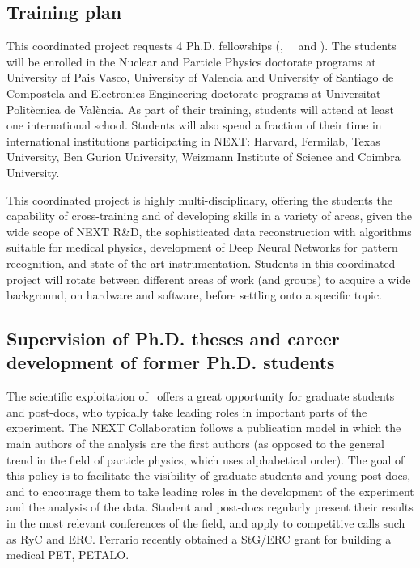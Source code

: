 \subsection{\label{subsubsec:training}Training plan}

\indent 

This coordinated project requests 4 Ph.D. fellowships (\sDIPC, \sIFIC\ \sUSC\ and \sUPV). The students will be enrolled in the Nuclear and Particle Physics doctorate programs at University of Pais Vasco, University of Valencia and University of Santiago de Compostela and Electronics Engineering doctorate programs at Universitat Politècnica de València. As part of their training, students will attend at least one international school. Students will also spend a fraction of their time in international institutions participating in NEXT: Harvard, Fermilab, Texas University, Ben Gurion University, Weizmann Institute of Science and Coimbra University.

\indent 

This coordinated project is highly multi-disciplinary, offering the students the capability of cross-training and of developing skills in a variety of areas, given the wide scope of NEXT R\&D, the sophisticated data reconstruction with algorithms suitable for medical physics, development of Deep Neural Networks for pattern recognition, and state-of-the-art instrumentation. Students in this coordinated project will rotate between different areas of work (and groups) to acquire a wide background, on hardware and software, before settling onto a specific topic.

\subsection{Supervision of Ph.D. theses and career development of former Ph.D. students}

The scientific exploitation of \Next\ offers a great opportunity for graduate students and post-docs, who typically take leading roles in important parts of the experiment. The NEXT Collaboration follows a publication model in which the main authors of the analysis are the first authors (as opposed to the general trend in the field of particle physics, which uses alphabetical order). The goal of this policy is to facilitate the visibility of graduate students and young post-docs, and to encourage them to take leading roles in the development of the experiment and the analysis of the data. Student and post-docs regularly present their results in the most relevant conferences of the field, and apply to competitive calls such as RyC and ERC. Ferrario recently obtained a StG/ERC grant for building a medical PET, PETALO.

